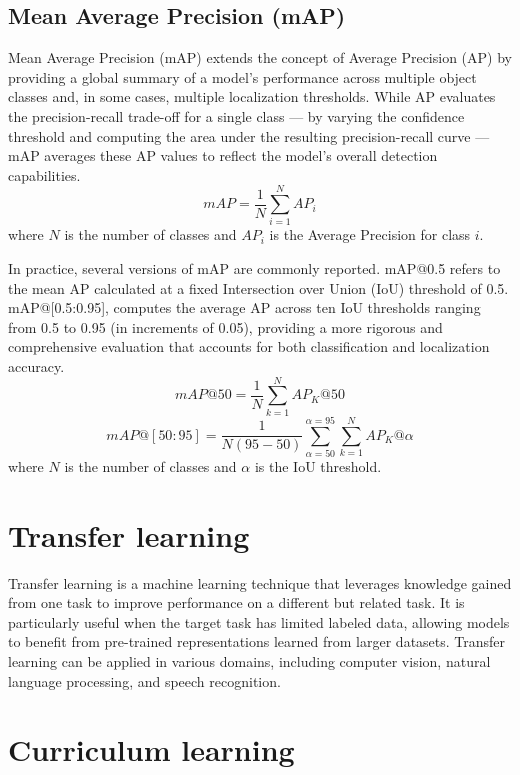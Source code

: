 \subsection*{Mean Average Precision (mAP)}
Mean Average Precision (mAP) extends the concept of Average Precision (AP) by providing a global summary of a model’s performance across multiple object classes and, in some cases, multiple localization thresholds. While AP evaluates the precision-recall trade-off for a single class — by varying the confidence threshold and computing the area under the resulting precision-recall curve — mAP averages these AP values to reflect the model’s overall detection capabilities.
\begin{equation}
    mAP = \frac{1}{N} \sum_{i=1}^{N} AP_i
\end{equation}
where \( N \) is the number of classes and \( AP_i \) is the Average Precision for class \( i \).

In practice, several versions of mAP are commonly reported. mAP@0.5 refers to the mean AP calculated at a fixed Intersection over Union (IoU) threshold of 0.5. mAP@[0.5:0.95], computes the average AP across ten IoU thresholds ranging from 0.5 to 0.95 (in increments of 0.05), providing a more rigorous and comprehensive evaluation that accounts for both classification and localization accuracy.
\begin{equation}
    mAP@50 = \frac{1}{N} \sum_{k=1}^{N} AP_K@50
\end{equation}
\begin{equation}
    mAP@[50:95] = \frac{1}{N(95-50)}\sum_{\alpha = 50}^{\alpha = 95}\sum_{k=1}^{N} AP_K@\alpha
\end{equation}
where \( N \)  is the number of classes and \(\alpha\) is the IoU threshold.
\section{Transfer learning}
Transfer learning is a machine learning technique that leverages knowledge gained from one task to improve performance on a different but related task. It is particularly useful when the target task has limited labeled data, allowing models to benefit from pre-trained representations learned from larger datasets. Transfer learning can be applied in various domains, including computer vision, natural language processing, and speech recognition.
\section{Curriculum learning}